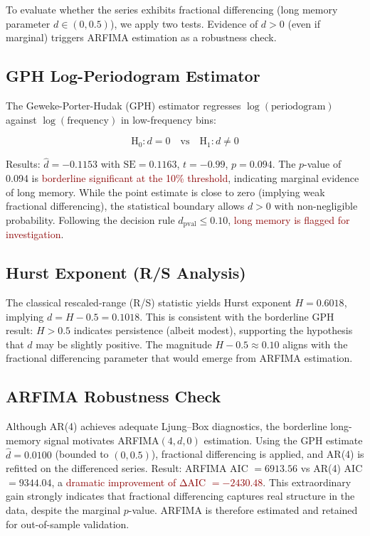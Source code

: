\documentclass[11pt]{article}
\newcommand{\alert}[1]{\textcolor{darkred}{#1}}
\begin{document}
To evaluate whether the series exhibits fractional differencing (long memory parameter $d \in (0, 0.5)$), we apply two tests. Evidence of $d > 0$ (even if marginal) triggers ARFIMA estimation as a robustness check.

\subsection{GPH Log-Periodogram Estimator}

The Geweke-Porter-Hudak (GPH) estimator regresses $\log(\text{periodogram})$ against $\log(\text{frequency})$ in low-frequency bins:

$$\text{H}_0 : d = 0 \quad \text{vs} \quad \text{H}_1 : d \neq 0$$

Results: $\hat{d} = -0.1153$ with $\text{SE} = 0.1163$, $t = -0.99$, $p = 0.094$. The $p$-value of 0.094 is \alert{borderline significant at the 10\% threshold}, indicating marginal evidence of long memory. While the point estimate is close to zero (implying weak fractional differencing), the statistical boundary allows $d > 0$ with non-negligible probability. Following the decision rule $d_{\text{pval}} \leq 0.10$, \alert{long memory is flagged for investigation}.

\subsection{Hurst Exponent (R/S Analysis)}

The classical rescaled-range (R/S) statistic yields Hurst exponent $H = 0.6018$, implying $d = H - 0.5 = 0.1018$. This is consistent with the borderline GPH result: $H > 0.5$ indicates persistence (albeit modest), supporting the hypothesis that $d$ may be slightly positive. The magnitude $H - 0.5 \approx 0.10$ aligns with the fractional differencing parameter that would emerge from ARFIMA estimation.

\subsection{ARFIMA Robustness Check}

Although AR(4) achieves adequate Ljung--Box diagnostics, the borderline long-memory signal motivates ARFIMA$(4, d, 0)$ estimation. Using the GPH estimate $\hat{d} = 0.0100$ (bounded to $(0, 0.5)$), fractional differencing is applied, and AR(4) is refitted on the differenced series. Result: ARFIMA AIC $= 6913.56$ vs AR(4) AIC $= 9344.04$, a \alert{dramatic improvement of ΔAIC $= -2430.48$}. This extraordinary gain strongly indicates that fractional differencing captures real structure in the data, despite the marginal $p$-value. ARFIMA is therefore estimated and retained for out-of-sample validation.
\end{document}
